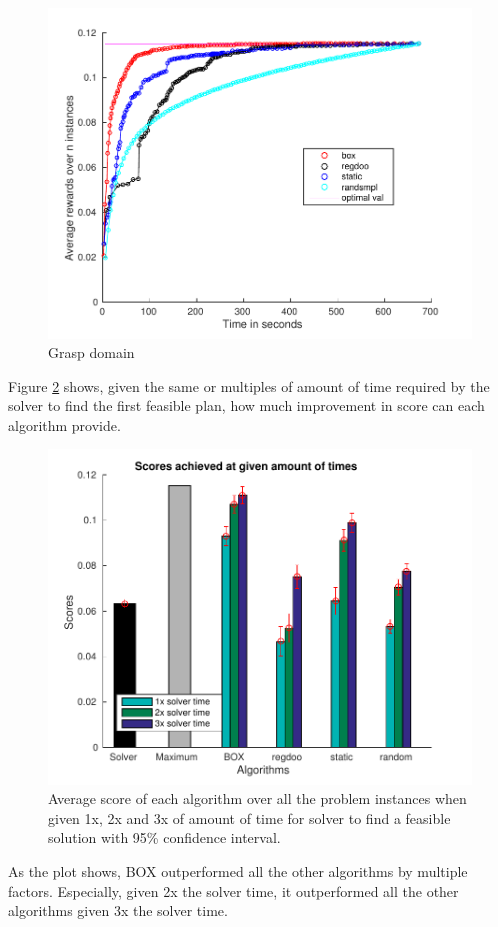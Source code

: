 \begin{figure}[htb]
\centering
\includegraphics[scale=0.5]{./figures/only_grasp_vs_t.pdf}
\caption{ Grasp domain }
\label{fig:only_grasp_t}
\end{figure} 


\iffalse
Figure \ref{fig:time_limit_scores_grasp} shows, given the same
or multiples of amount of time required by the solver to find
 the first feasible plan, how much improvement in score 
can each algorithm provide.
\begin{figure}[htb]
\centering
\includegraphics[scale=0.5]{./figures/only_grasp_opt_plot.pdf}
\caption{ Average score of each algorithm over all the problem instances when given 1x, 2x and 3x of amount of time for solver to find a feasible solution with 95\% confidence
interval. }
\label{fig:time_limit_scores_grasp}
\end{figure} 
As the plot shows, BOX outperformed all the other algorithms by
multiple factors. Especially, given 2x the solver time, it outperformed
all the other algorithms given 3x the solver time. 


